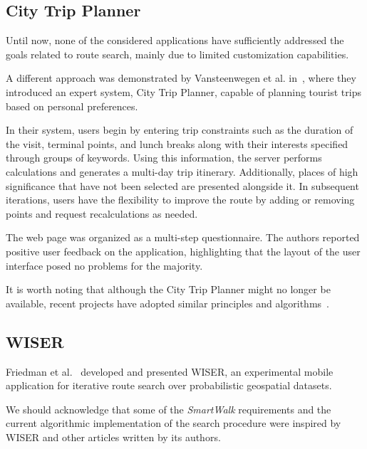 
\subsection{City Trip Planner}\label{ssec:city-trip-planner}

Until now, none of the considered applications have sufficiently addressed the goals related to route search, mainly due to limited customization capabilities.

A different approach was demonstrated by Vansteenwegen et al. in~\cite{vansteenwegen11}, where they introduced an expert system, City Trip Planner, capable of planning tourist trips based on personal preferences.

In their system, users begin by entering trip constraints such as the duration of the visit, terminal points, and lunch breaks along with their interests specified through groups of keywords. Using this information, the server performs calculations and generates a multi-day trip itinerary. Additionally, places of high significance that have not been selected are presented alongside it. In subsequent iterations, users have the flexibility to improve the route by adding or removing points and request recalculations as needed.

The web page was organized as a multi-step questionnaire. The authors reported positive user feedback on the application, highlighting that the layout of the user interface posed no problems for the majority.

It is worth noting that although the City Trip Planner might no longer be available, recent projects have adopted similar principles and algorithms~\cite{herzog18, herzog19}.

\subsection{WISER}\label{ssec:wiser}

Friedman et al.~\cite{friedman12} developed and presented WISER, an experimental mobile application for iterative route search over probabilistic geospatial datasets.

We should acknowledge that some of the \emph{SmartWalk} requirements and the current algorithmic implementation of the search procedure were inspired by WISER and other articles written by its authors.

